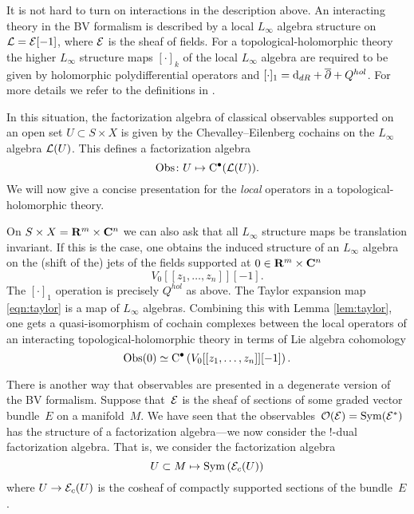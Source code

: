 \parsec[s:interaction]

It is not hard to turn on interactions in the description above. 
An interacting theory in the BV formalism is described by a local $L_\infty$ algebra structure on $\mathcal L = \mathcal E[-1]$, where $\mathcal E$ is the sheaf of fields.
For a topological-holomorphic theory the higher $L_\infty$ structure maps $[\cdot]_k$ of the local $L_\infty$ algebra are required to be given by holomorphic polydifferential operators and $[\cdot]_1 = {\rm d}_{dR} + \overline{\partial} + Q^{hol}$.  
For more details we refer to the definitions in \cite{GRWthf}.

In this situation, the factorization algebra of classical observables supported on an open set $U \subset S \times X$ is given by the Chevalley--Eilenberg cochains on the $L_\infty$ algebra $\mathcal L(U)$. 
This defines a factorization algebra 
\[
\operatorname{Obs} \colon U \mapsto {\rm C}^\bullet(\mathcal L(U)) .
\]
We will now give a concise presentation for the {\em local} operators in a topological-holomorphic theory. 

On $S \times X = \mathbf{R}^m \times \mathbf{C}^n$ we can also ask that all $L_\infty$ structure maps be translation invariant. 
If this is the case, one obtains the induced structure of an $L_\infty$ algebra on the (shift of the) jets of the fields supported at $0 \in \mathbf{R}^m \times \mathbf{C}^n$
\[
V_0 [[z_1,\ldots,z_n]] [-1] .
\]
The $[\cdot]_1$ operation is precisely $Q^{hol}$ as above.
The Taylor expansion map \eqref{eqn:taylor} is a map of $L_\infty$ algebras. 
Combining this with Lemma \ref{lem:taylor}, one gets a quasi-isomorphism of cochain complexes between the local operators of an interacting topological-holomorphic theory in terms of Lie algebra cohomology
\[
\operatorname{Obs}(0) \simeq {\rm C}^\bullet\left(V_0[[z_1,\ldots,z_n]][-1]\right) .
\]


\parsec[s:envelope]

There is another way that observables are presented in a degenerate version of the BV formalism.
Suppose that~$\mathcal E$ is the sheaf of sections of some graded vector bundle~$E$ on a manifold~$M$.
We have seen that the observables~$\mathcal O(\mathcal E) = \operatorname{Sym}(\mathcal E^*)$ has the structure of a factorization algebra---we now consider the $!$-dual factorization algebra.
That is, we consider the factorization algebra 
\[
U \subset M \mapsto \operatorname{Sym} \left(\mathcal E_c(U) \right) 
\]
where $U \to \mathcal E_c(U)$ is the cosheaf of compactly supported sections of the bundle~$E$.

